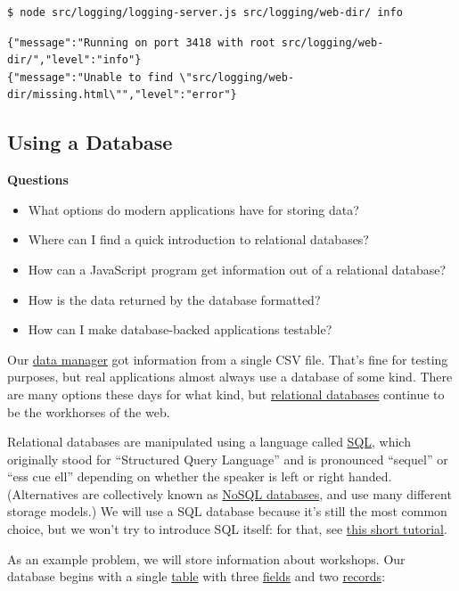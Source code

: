 \begin{verbatim}
$ node src/logging/logging-server.js src/logging/web-dir/ info
\end{verbatim}

\begin{verbatim}
{"message":"Running on port 3418 with root src/logging/web-dir/","level":"info"}
{"message":"Unable to find \"src/logging/web-dir/missing.html\"","level":"error"}
\end{verbatim}

\hypertarget{s:db}{\subsection{Using a Database}\label{s:db}}

\textbf{Questions}

\begin{itemize}
\tightlist
\item
  What options do modern applications have for storing data?
\item
  Where can I find a quick introduction to relational databases?
\item
  How can a JavaScript program get information out of a relational
  database?
\item
  How is the data returned by the database formatted?
\item
  How can I make database-backed applications testable?
\end{itemize}

Our \protect\hyperlink{s:dataman}{data manager} got information from a
single CSV file. That's fine for testing purposes, but real applications
almost always use a database of some kind. There are many options these
days for what kind, but
\protect\hyperlink{g:relational-database}{relational databases} continue
to be the workhorses of the web.

Relational databases are manipulated using a language called
\protect\hyperlink{g:sql}{SQL}, which originally stood for ``Structured
Query Language'' and is pronounced ``sequel'' or ``ess cue ell''
depending on whether the speaker is left or right handed. (Alternatives
are collectively known as \protect\hyperlink{g:nosql-database}{NoSQL
databases}, and use many different storage models.) We will use a SQL
database because it's still the most common choice, but we won't try to
introduce SQL itself: for that, see
\href{https://swcarpentry.github.io/sql-novice-survey/}{this short
tutorial}.

As an example problem, we will store information about workshops. Our
database begins with a single \protect\hyperlink{g:table}{table} with
three \protect\hyperlink{g:field}{fields} and two
\protect\hyperlink{g:record}{records}:

